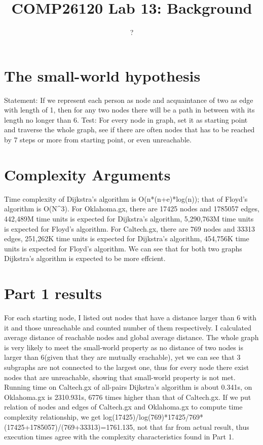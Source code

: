 \documentclass{article}
\title{COMP26120 Lab 13: Background}
\author{?}
\begin{document}
\maketitle


\section{The small-world hypothesis}
\label{sec:small world}
Statement: If we represent each person as node and acquaintance of two as edge with length of 1, then for any two nodes there will be a path in between with its length no longer than 6.
Test: For every node in graph, set it as starting point and traverse the whole graph, see if there are often nodes that has to be reached by 7 steps or more from starting point, or even unreachable.

\section{Complexity Arguments}
\label{sec:complexity}
Time complexity of Dijkstra's algorithm is O(n*(n+e)*log(n)); that of Floyd's algorithm is O(N^3).
For Oklahoma.gx, there are 17425 nodes and 1785057 edges, 442,489M time units is expected for Dijkstra's algorithm, 5,290,763M time units is expected for Floyd's algorithm.
For Caltech.gx, there are 769 nodes and 33313 edges, 251,262K time units is expected for Dijkstra's algorithm, 454,756K time units is expected for Floyd's algorithm.
We can see that for both two graphs Dijkstra's algorithm is expected to be more effcient.

\section{Part 1 results}
\label{sec:part1}
For each starting node, I listed out nodes that have a distance larger than 6 with it and those unreachable and counted number of them respectively. I calculated average distance of reachable nodes and global average distance. The whole graph is very likely to meet the small-world property as no distance of two nodes is larger than 6(given that they are mutually erachable), yet we can see that 3 subgraphs are not connected to the largest one, thus for every node there exist nodes that are unreachable, showing that small-world property is not met.
Running time on Caltech.gx of all-pairs Dijkstra's algorithm is about 0.341s, on Oklahoma.gx is 2310.931s, 6776 times higher than that of Caltech.gx. 
If we put relation of nodes and edges of Caltech.gx and Oklahoma.gx to compute time complexity relationship, we get log(17425)/log(769)*17425/769*(17425+1785057)/(769+33313)=1761.135, not that far from actual result, thus execution times agree with the complexity characteristics found in Part 1.
\end{document}
